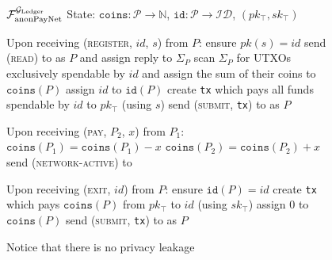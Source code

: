 \begin{figure}[H]
  \begin{systembox}{$\mathcal{F}_{\mathrm{anonPayNet}}^{\mathcal{G}_{\mathrm{Ledger}}}$}
    State: $\mathtt{coins} : \mathcal{P} \rightarrow \mathbb{N}$,
    $\mathtt{id} : \mathcal{P} \rightarrow \mathcal{ID}$, $(pk_{\top},
    sk_{\top})$
    \begin{algorithmic}[1]
      \State Upon receiving (\textsc{register}, $id$, $s$) from $P$:
      \Indent
        \State ensure $pk(s) = id$
        \State send (\textsc{read}) to \ledger as $P$ and assign reply to
        $\Sigma_P$
        \State scan $\Sigma_P$ for UTXOs exclusively spendable by $id$ and
        assign the sum of their coins to $\mathtt{coins}(P)$
        \State assign $id$ to $\mathtt{id}(P)$
        \State create \texttt{tx} which pays all funds spendable by $id$ to
        $pk_{\top}$ (using $s$)
        \State send (\textsc{submit}, \texttt{tx}) to \ledger as $P$
      \EndIndent
      \Statex

      \State Upon receiving (\textsc{pay}, $P_2$, $x$) from $P_1$:
      \Indent
          \State $\mathtt{coins}(P_1) = \mathtt{coins}(P_1) - x$
          \State $\mathtt{coins}(P_2) = \mathtt{coins}(P_2) + x$
        \EndIf
        send (\textsc{network-active}) to \adversary
      \EndIndent
      \Statex

      \State Upon receiving (\textsc{exit}, $id$) from $P$:
      \Indent
        \State ensure $\mathtt{id}(P) = id$
        \State create \texttt{tx} which pays $\mathtt{coins}(P)$ from
        $pk_{\top}$ to $id$ (using $sk_{\top}$)
        \State assign $0$ to $\mathtt{coins}(P)$
        \State send (\textsc{submit}, \texttt{tx}) to \ledger as $P$
      \EndIndent
    \end{algorithmic}
  \end{systembox}
  \caption{Notice that there is no privacy leakage}
  \label{alg:anon-pay-func}
\end{figure}
